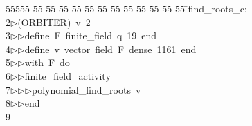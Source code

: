 %
%
\begin{tabbing}
55555 \= 55 \= 55 \= 55 \= 55 \= 55 \= 55 \= 55 \= 55 \= 55 \= 55 \= 55 \= 55 \= \>find\_roots\_c:\\[0pt]
2\>$\triangleright$\>(ORBITER)\ v\ 2\ \\[0pt]
3\>$\triangleright$\>$\triangleright$\>define\ F\ finite\_field\ q\ 19\ end\ \\[0pt]
4\>$\triangleright$\>$\triangleright$\>define\ v\ vector\ field\ F\ dense\ 1161\ end\ \\[0pt]
5\>$\triangleright$\>$\triangleright$\>with\ F\ do\ \\[0pt]
6\>$\triangleright$\>$\triangleright$\>finite\_field\_activity\ \\[0pt]
7\>$\triangleright$\>$\triangleright$\>$\triangleright$\>polynomial\_find\_roots\ v\ \\[0pt]
8\>$\triangleright$\>$\triangleright$\>end\\[0pt]
9\>\end{tabbing}

